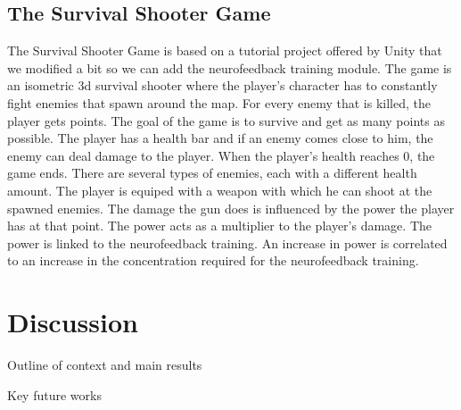 \documentclass[runningheads]{llncs}
\begin{document}
\subsection{The Survival Shooter Game}
The Survival Shooter Game is based on a tutorial project offered by Unity that we modified a bit so we can add the neurofeedback training module. The game is an isometric 3d survival shooter where the player's character has to constantly fight enemies that spawn around the map. For every enemy that is killed, the player gets points. The goal of the game is to survive and get as many points as possible. The player has a health bar and if an enemy comes close to him, the enemy can deal damage to the player. When the player's health reaches 0, the game ends. There are several types of enemies, each with a different health amount. The player is equiped with a weapon with which he can shoot at the spawned enemies. The damage the gun does is influenced by the power the player has at that point. The power acts as a multiplier to the player's damage. The power is linked to the neurofeedback training. An increase in power is correlated to an increase in the concentration required for the neurofeedback training.

\section{Discussion}

Outline of context and main results

Key future works



\end{document}
